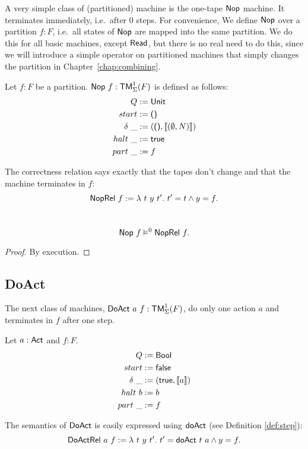 A very simple class of (partitioned) machine is the one-tape $\textsf{Nop}$ machine.  It terminates immediately, i.e.\ after 0 steps.  For convenience, We
define $\textsf{Nop}$ over a partition $f:F$, i.e.\ all states of $\textsf{Nop}$ are mapped into the same partition.  We do this for all basic machines, except
$\textsf{Read}$, but there is no real need to do this, since we will introduce a simple operator on partitioned machines that simply changes the partition
in Chapter~\ref{chap:combining}.
\begin{definition}[Nop]
  \label{def:Nop}
  Let $f:F$ be a partition.  $\textsf{Nop}~f: \textsf{TM}_\Sigma^1(F)$ is defined as follows:
  \begin{align*}
    Q          &:= \textsf{Unit} \\
    start      &:= \textsf{()} \\
    \delta ~\_ &:= (\textsf{()}, \left\llbracket (\emptyset, N) \right\rrbracket) \\
    halt   ~\_ &:= \textsf{true} \\
    part   ~\_ &:= f
  \end{align*}
\end{definition}
The correctness relation says exactly that the tapes don't change and that the machine terminates in $f$:
\[
  \textsf{NopRel}~f := \lambda~t~y~t'.~ t' = t \land y = f.
\]
\begin{lemma}
  \label{lem:Nop_Sem}
  ~
  \[
    \textsf{Nop}~f \vDash^0 \textsf{NopRel}~f.
  \]
\end{lemma}
\begin{proof}
  By execution.
\end{proof}

\subsection{DoAct}
\label{sec:DoAct}

The next class of machines, $\textsf{DoAct}~a~f : \textsf{TM}_\Sigma^1(F)$, do only one action $a$ and terminates in $f$ after one step.
\begin{definition}[$\MS{DoAct}~a~f$]
  \label{def:DoAct}
  Let $a:\textsf{Act}$ and $f:F$.
  \begin{align*}
    Q          &:= \textsf{Bool} \\
    start      &:= \textsf{false} \\
    \delta ~\_ &:= (\textsf{true}, \left\llbracket a \right\rrbracket) \\
    halt   ~ b &:= b \\
    part   ~\_ &:= f
  \end{align*}
\end{definition}
The semantics of $\textsf{DoAct}$ is easily expressed using $\textsf{doAct}$ (see Definition \ref{def:step}):
\[
  \textsf{DoActRel}~a~f := \lambda~t~y~t'.~ t' = \textsf{doAct}~t~a \land y = f.
\]

